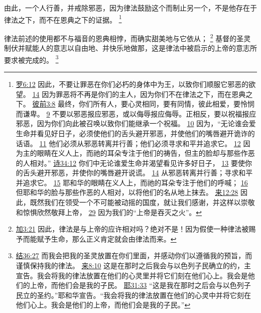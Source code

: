 \documentclass[12pt, a4paper, oneside]{ctexart}
\newcounter{parnum}[section]
\newcommand{\N}{%
   \noindent\refstepcounter{parnum}%
    \makebox[\parindent][l]{\textbf{\arabic{parnum}.}}}
\begin{document}
	由此，一个人行善，并戒除邪恶，因为律法鼓励这个而制止另一个，不是他存在于律法之下，而不在恩典之下的证据。
	\footnote {
		\href{https://biblehub.com/romans/6-12.htm}{罗6:12} 因此，不要让罪恶在你们必朽的身体中为王，以致你们顺服它邪恶的欲望。
		\href{https://biblehub.com/romans/6-14.htm}{14} 因为罪恶将不再是你们的主人，因为你们不在律法之下，而在恩典之下。
		\href{https://biblehub.com/1_peter/3-8.htm}{彼前3:8} 最终，你们所有人，要心灵相同，要有同情，彼此相爱，要怜悯而谦卑。
		\href{https://biblehub.com/1_peter/3-9.htm}{9} 不要以邪恶报应邪恶，或以侮辱报应侮辱。正相反，要以祝福报应邪恶，因为你们向此被召唤以致你们能继承一个祝福。
		\href{https://biblehub.com/1_peter/3-10.htm}{10} 因为，“无论谁会爱生命并看见好日子，必须使他们的舌头避开邪恶，并使他们的嘴唇避开诡诈的话语。
		\href{https://biblehub.com/1_peter/3-11.htm}{11} 他们必须从邪恶转离并行善；他们必须寻求和平并追求它。
		\href{https://biblehub.com/1_peter/3-12.htm}{12} 因为主的眼睛在义人上，而祂的耳朵专注于他们的祷告，但主的脸却与那些作恶的人相对。”
		\href{https://biblehub.com/psalms/34-12.htm}{诗34:12} 你们中无论谁爱生命并渴望看见许多好日子，
		\href{https://biblehub.com/psalms/34-13.htm}{13} 要使你的舌头避开邪恶，并使你的嘴唇避开说谎。
		\href{https://biblehub.com/psalms/34-14.htm}{14} 从邪恶转离并行善；寻求和平并追求它。
		\href{https://biblehub.com/psalms/34-15.htm}{15} 耶和华的眼睛在义人上，而祂的耳朵专注于他们的呼喊；
		\href{https://biblehub.com/psalms/34-16.htm}{16} 但耶和华的脸与那些作恶的人相对，以将他们的名从地上抹去。
		\href{https://biblehub.com/hebrews/12-28.htm}{来12:28} 因此，既然我们在领受一个不可能被动摇的国度，就让我们感谢，并这样以崇敬和惊惧欣然敬拜上帝，
		\href{https://biblehub.com/hebrews/12-29.htm}{29} 因为我们的“上帝是吞灭之火”。
	}

\N 律法前述的使用都不与福音的恩典相悖，而确实甜美地与它依从；
	\footnote {
		\href{https://biblehub.com/galatians/3-21.htm}{加3:21} 因此，律法是与上帝的应许相对吗？绝对不是！因为假使一种律法被赐予而能赋予生命，那么正义肯定就会由律法而来。
	}
	基督的圣灵制伏并赋能人的意志以自由地、并快乐地做那，这是律法中被启示的上帝的意志所要求被完成的。
	\footnote {
		\href{https://biblehub.com/ezekiel/36-27.htm}{结36:27} 而我会把我的圣灵放置在你们里面，并感动你们以遵循我的预旨，而谨慎保持我的律法。
		\href{https://biblehub.com/hebrews/8-10.htm}{来8:10} 这是在那时之后我会与以色列子民确立的约，主宣告。我会将我的律法放置在他们的心灵里并将它们刻在他们心上。我会是他们的上帝，而他们会是我的子民。
		\href{https://biblehub.com/jeremiah/31-33.htm}{耶31:33} “这是我在那时之后会与以色列子民立的圣约。”耶和华宣告。“我会将我的律法放置在他们的心灵中并将它刻在他们心上。我会是他们的上帝，而他们会是我的子民。”
	}
\end{document}
